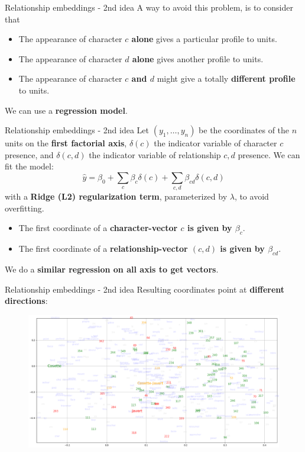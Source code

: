 \documentclass[10pt]{beamer}
\newcommand{\imp}[1]{\textbf{\color{cyan}#1}}
\begin{document}
	
	\begin{frame}{Relationship embeddings - 2nd idea}
		A way to avoid this problem, is to consider that
		\begin{itemize}
			\item The appearance of character \imp{$c$ alone} gives a particular profile to units.
			\item The appearance of character \imp{$d$ alone} gives another profile to units.
			\item The appearance of character \imp{$c$ and $d$} might give a totally \imp{different profile} to units.
		\end{itemize}
		We can use a \imp{regression model}.
	\end{frame}
	
	
	\begin{frame}{Relationship embeddings - 2nd idea}
		Let $(y_1, \ldots, y_n)$ be the coordinates of the $n$ units on the \imp{first factorial axis}, $\delta(c)$ the indicator variable of character $c$ presence, and $\delta(c,d)$ the indicator variable of relationship $c,d$ presence. We can fit the model:
		$$
		\hat{y} = \beta_0 + \sum_{c} \beta_c \delta(c) + \sum_{c,d} \beta_{cd} \delta(c,d)
		$$
		with a \imp{Ridge (L2) regularization term}, parameterized by $\lambda$, to avoid overfitting.
		\begin{itemize}
		\item The first coordinate of a \imp{character-vector $c$ is given by $\beta_c$}.
		\item The first coordinate of a \imp{relationship-vector $(c,d)$ is given by $\beta_{cd}$}.
		\end{itemize}
		We do a \imp{similar regression on all axis to get vectors}.
	\end{frame}
	
	
	\begin{frame}{Relationship embeddings - 2nd idea}
		Resulting coordinates point at \imp{different directions}:
		\begin{figure}
			\centering
			\includegraphics[width=\textwidth]{img/reg_embeddings.png}
		\end{figure}
	\end{frame}
	
\end{document}
